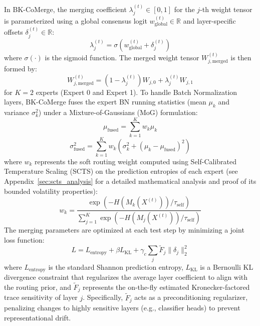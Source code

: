 \documentclass{article}
\theoremstyle{plain}
\theoremstyle{definition}
\theoremstyle{remark}
\begin{document}
In BK-CoMerge, the merging coefficient $\lambda_j^{(t)} \in [0, 1]$ for the $j$-th weight tensor is parameterized using a global consensus logit $w_{\text{global}}^{(t)} \in \mathbb{R}$ and layer-specific offsets $\delta_j^{(t)} \in \mathbb{R}$:
\begin{equation}
    \lambda_j^{(t)} = \sigma(w_{\text{global}}^{(t)} + \delta_j^{(t)})
\end{equation}
where $\sigma(\cdot)$ is the sigmoid function. The merged weight tensor $W_{j,\text{merged}}^{(t)}$ is then formed by:
\begin{equation}
    W_{j,\text{merged}}^{(t)} = (1 - \lambda_j^{(t)}) W_{j,0} + \lambda_j^{(t)} W_{j,1}
\end{equation}
for $K=2$ experts (Expert 0 and Expert 1). To handle Batch Normalization layers, BK-CoMerge fuses the expert BN running statistics (mean $\mu_k$ and variance $\sigma^2_k$) under a Mixture-of-Gaussians (MoG) formulation:
\begin{equation}
    \mu_{\text{fused}} = \sum_{k=1}^K w_k \mu_k
\end{equation}
\begin{equation}
    \sigma^2_{\text{fused}} = \sum_{k=1}^K w_k (\sigma^2_k + (\mu_k - \mu_{\text{fused}})^2)
\end{equation}
where $w_k$ represents the soft routing weight computed using Self-Calibrated Temperature Scaling (SCTS) on the prediction entropies of each expert (see Appendix~\ref{sec:scts_analysis} for a detailed mathematical analysis and proof of its bounded volatility properties):
\begin{equation}
    w_k = \frac{\exp(-H(M_k(X^{(t)})) / \tau_{\text{self}})}{\sum_{j=1}^K \exp(-H(M_j(X^{(t)})) / \tau_{\text{self}})}
\end{equation}
The merging parameters are optimized at each test step by minimizing a joint loss function:
\begin{equation}
    L = L_{\text{entropy}} + \beta L_{\text{KL}} + \gamma_c \sum_j \tilde{F}_j \|\delta_j\|_2^2
\end{equation}
where $L_{\text{entropy}}$ is the standard Shannon prediction entropy, $L_{\text{KL}}$ is a Bernoulli KL divergence constraint that regularizes the average layer coefficient to align with the routing prior, and $\tilde{F}_j$ represents the on-the-fly estimated Kronecker-factored trace sensitivity of layer $j$. Specifically, $\tilde{F}_j$ acts as a preconditioning regularizer, penalizing changes to highly sensitive layers (e.g., classifier heads) to prevent representational drift.
\end{document}
